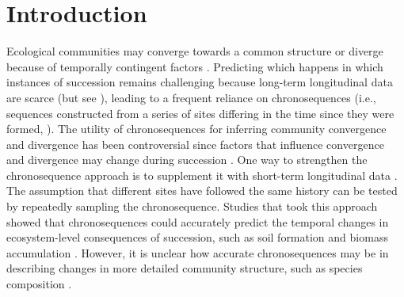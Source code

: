 \section{Introduction}
Ecological communities may converge towards a common structure or diverge because of temporally contingent factors \citep{Fukami2005, DiniAndreote2015, Meiners2015, Clark2019}.
Predicting which happens in which instances of succession remains challenging because long-term longitudinal data are scarce (but see \citealp{Li2016}), leading to a frequent reliance on chronosequences (i.e., sequences constructed from a series of sites differing in the time since they were formed, \citealp{Walker2010}). 
The utility of chronosequences for inferring community convergence and divergence has been controversial since factors that influence convergence and divergence may change during succession \citep{Johnson2008, Damgaard2019}.
One way to strengthen the chronosequence approach is to supplement it with short-term longitudinal data \citep{Damgaard2019}. The assumption that different sites have followed the same history can be tested by repeatedly sampling the chronosequence.
Studies that took this approach showed that chronosequences could accurately predict the temporal changes in ecosystem-level consequences of succession, such as soil formation and biomass accumulation \citep{vanbreugel2006, Lebrijatrejos2010, Walker2010}.
However, it is unclear how accurate chronosequences may be in describing changes in more detailed community structure, such as species composition \citep{Foster2000, Mora2015, Rolo2016}.
\par


